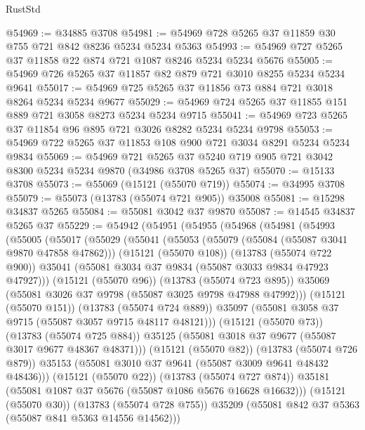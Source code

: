 \begin{lexlean}{RustStd}
\begin{coremodule}
@54969 := @34885 @3708
@54981 := @54969 @728 @5265 @37 @11859 @30 @755 @721 @842 @8236 @5234 @5234 @5363
@54993 := @54969 @727 @5265 @37 @11858 @22 @874 @721 @1087 @8246 @5234 @5234 @5676
@55005 := @54969 @726 @5265 @37 @11857 @82 @879 @721 @3010 @8255 @5234 @5234 @9641
@55017 := @54969 @725 @5265 @37 @11856 @73 @884 @721 @3018 @8264 @5234 @5234 @9677
@55029 := @54969 @724 @5265 @37 @11855 @151 @889 @721 @3058 @8273 @5234 @5234 @9715
@55041 := @54969 @723 @5265 @37 @11854 @96 @895 @721 @3026 @8282 @5234 @5234 @9798
@55053 := @54969 @722 @5265 @37 @11853 @108 @900 @721 @3034 @8291 @5234 @5234 @9834
@55069 := @54969
    @721
    @5265
    @37
    @5240
    @719
    @905
    @721
    @3042
    @8300
    @5234
    @5234
    @9870
    (@34986 @3708 @5265 @37)
@55070 := @15133 @3708
@55073 := @55069 (@15121 (@55070 @719))
@55074 := @34995 @3708
@55079 := @55073 (@13783 (@55074 @721 @905)) @35008
@55081 := @15298 @34837 @5265
@55084 := @55081 @3042 @37 @9870
@55087 := @14545 @34837 @5265 @37
@55229 := @54942
    (@54951
      (@54955
        (@54968
          (@54981
            (@54993
              (@55005
                (@55017
                  (@55029
                    (@55041
                      (@55053
                        (@55079 (@55084 (@55087 @3041 @9870 @47858 @47862)))
                        (@15121 (@55070 @108))
                        (@13783 (@55074 @722 @900))
                        @35041
                        (@55081 @3034 @37 @9834 (@55087 @3033 @9834 @47923 @47927)))
                      (@15121 (@55070 @96))
                      (@13783 (@55074 @723 @895))
                      @35069
                      (@55081 @3026 @37 @9798 (@55087 @3025 @9798 @47988 @47992)))
                    (@15121 (@55070 @151))
                    (@13783 (@55074 @724 @889))
                    @35097
                    (@55081 @3058 @37 @9715 (@55087 @3057 @9715 @48117 @48121)))
                  (@15121 (@55070 @73))
                  (@13783 (@55074 @725 @884))
                  @35125
                  (@55081 @3018 @37 @9677 (@55087 @3017 @9677 @48367 @48371)))
                (@15121 (@55070 @82))
                (@13783 (@55074 @726 @879))
                @35153
                (@55081 @3010 @37 @9641 (@55087 @3009 @9641 @48432 @48436)))
              (@15121 (@55070 @22))
              (@13783 (@55074 @727 @874))
              @35181
              (@55081 @1087 @37 @5676 (@55087 @1086 @5676 @16628 @16632)))
            (@15121 (@55070 @30))
            (@13783 (@55074 @728 @755))
            @35209
            (@55081 @842 @37 @5363 (@55087 @841 @5363 @14556 @14562)))

\end{coremodule}
\end{lexlean}
